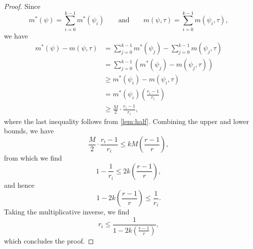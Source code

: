 \documentclass[]{article}
\theoremstyle{plain}
\theoremstyle{definition}
\begin{document}
\begin{proof}
  Since
  \begin{equation*}
    m^*(\psi) = \sum_{i = 0}^{k - 1}{m^*(\psi_i)} \qquad \text{and} \qquad m(\psi, \tau) = \sum_{i = 0}^{k - 1}{m(\psi_i, \tau)},
  \end{equation*}
  we have
  \begin{align*}
    m^*(\psi) - m(\psi, \tau) & = \sum_{j = 0}^{k - 1}{m^*(\psi_j)} - \sum_{j = 0}^{k - 1}{m(\psi_j, \tau)} \\
    & = \sum_{j = 0}^{k - 1}{\left(m^*(\psi_j) - m(\psi_j, \tau)\right)} \\
    & \geq m^*(\psi_i) - m(\psi_i, \tau) \\
    & = m^*(\psi_i) \left(\frac{r_i - 1}{r_i}\right) \\
    & \geq \frac{M}{2} \cdot \frac{r_i - 1}{r_i},
  \end{align*}
  where the last inequality follows from \autoref{lem:half}.
  Combining the upper and lower bounds, we have
  \begin{equation*}
    \frac{M}{2} \cdot \frac{r_i - 1}{r_i} \leq kM \left(\frac{r - 1}{r}\right),
  \end{equation*}
  from which we find
  \begin{equation*}
    1 - \frac{1}{r_i} \leq 2k\left(\frac{r - 1}{r}\right),
  \end{equation*}
  and hence
  \begin{equation*}
    1 - 2k\left(\frac{r - 1}{r}\right) \leq \frac{1}{r_i}.
  \end{equation*}
  Taking the multiplicative inverse, we find
  \begin{equation*}
    r_i \leq \frac{1}{1 - 2k\left(\frac{r - 1}{r}\right)},
  \end{equation*}
  which concludes the proof.
\end{proof}
\end{document}
